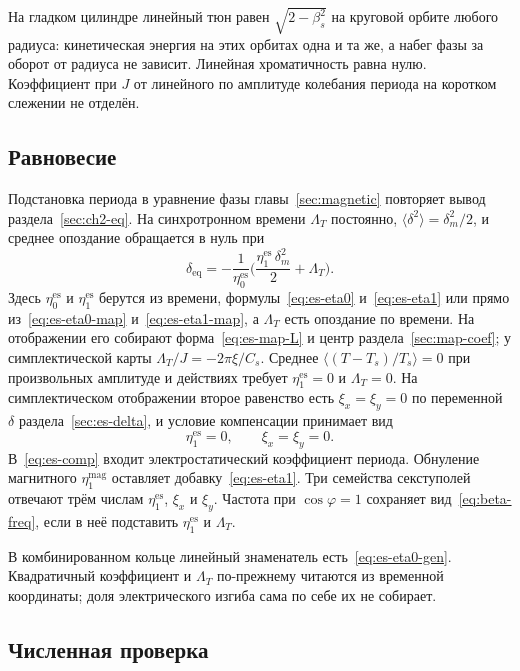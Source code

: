 \documentclass[aps,pra,preprint,a4paper,amsmath,amssymb,longbibliography]{revtex4-2}
\begin{document}
На гладком цилиндре линейный тюн равен $\sqrt{2-\beta_s^2}$ на круговой орбите любого радиуса: кинетическая энергия на этих орбитах одна и та же, а набег фазы за оборот от радиуса не зависит. Линейная хроматичность равна нулю. Коэффициент при $J$ от линейного по амплитуде колебания периода на коротком слежении не отделён.

\subsection{Равновесие}
\label{sec:es-eq}

Подстановка периода в уравнение фазы главы~\ref{sec:magnetic} повторяет вывод раздела~\ref{sec:ch2-eq}. На синхротронном времени $\Lambda_T$ постоянно, $\langle\delta^2\rangle=\delta_m^2/2$, и среднее опоздание обращается в нуль при
\begin{equation}
\label{eq:es-deq}
\delta_{\mathrm{eq}}
=-\frac{1}{\eta_0^{\mathrm{es}}}
\Biggl(
\frac{\eta_1^{\mathrm{es}}\,\delta_m^2}{2}
+\Lambda_T
\Biggr).
\end{equation}
Здесь $\eta_0^{\mathrm{es}}$ и $\eta_1^{\mathrm{es}}$ берутся из времени, формулы~\eqref{eq:es-eta0} и~\eqref{eq:es-eta1} или прямо из~\eqref{eq:es-eta0-map} и~\eqref{eq:es-eta1-map}, а $\Lambda_T$ есть опоздание по времени. На отображении его собирают форма~\eqref{eq:es-map-L} и центр раздела~\ref{sec:map-coef}; у симплектической карты $\Lambda_T/J=-2\pi\xi/C_s$. Среднее $\langle(T-T_s)/T_s\rangle=0$ при произвольных амплитуде и действиях требует $\eta_1^{\mathrm{es}}=0$ и $\Lambda_T=0$. На симплектическом отображении второе равенство есть $\xi_x=\xi_y=0$ по переменной $\delta$ раздела~\ref{sec:es-delta}, и условие компенсации принимает вид
\begin{equation}
\label{eq:es-comp}
\eta_1^{\mathrm{es}}=0,
\qquad
\xi_x=\xi_y=0.
\end{equation}
В~\eqref{eq:es-comp} входит электростатический коэффициент периода. Обнуление магнитного $\eta_1^{\mathrm{mag}}$ оставляет добавку~\eqref{eq:es-eta1}. Три семейства секступолей отвечают трём числам $\eta_1^{\mathrm{es}}$, $\xi_x$ и $\xi_y$. Частота при $\cos\varphi=1$ сохраняет вид~\eqref{eq:beta-freq}, если в неё подставить $\eta_1^{\mathrm{es}}$ и $\Lambda_T$.

В комбинированном кольце линейный знаменатель есть~\eqref{eq:es-eta0-gen}. Квадратичный коэффициент и $\Lambda_T$ по-прежнему читаются из временной координаты; доля электрического изгиба сама по себе их не собирает.

\subsection{Численная проверка}
\label{sec:es-num}
\end{document}
